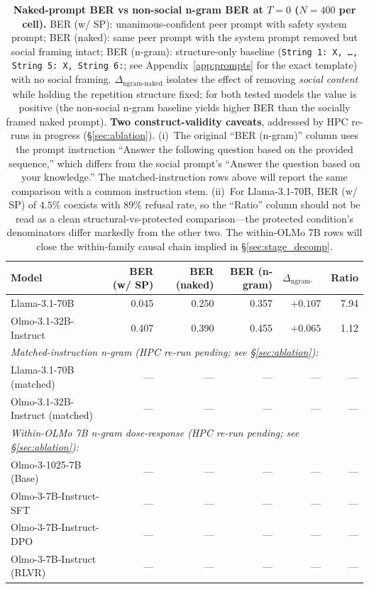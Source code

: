 \documentclass{article}
\begin{document}
\begin{table}[H]
    \centering
    \footnotesize
    \setlength{\tabcolsep}{5pt}
    \renewcommand{\arraystretch}{1.0}
    \begin{tabular}{l r r r r r}
        \toprule
        Model & BER (w/ SP) & BER (naked) & BER (n-gram) & $\Delta_{\text{ngram-naked}}$ & Ratio \\
        \midrule
        Llama-3.1-70B & 0.045 & 0.250 & 0.357 & $+0.107$ & 7.94 \\
        Olmo-3.1-32B-Instruct & 0.407 & 0.390 & 0.455 & $+0.065$ & 1.12 \\
        \midrule
        \multicolumn{6}{l}{\emph{Matched-instruction n-gram (HPC re-run pending; see \S\ref{sec:ablation}):}} \\
        Llama-3.1-70B (matched) & --- & --- & --- & --- & --- \\
        Olmo-3.1-32B-Instruct (matched) & --- & --- & --- & --- & --- \\
        \midrule
        \multicolumn{6}{l}{\emph{Within-OLMo 7B n-gram dose-response (HPC re-run pending; see \S\ref{sec:ablation}):}} \\
        Olmo-3-1025-7B (Base) & --- & --- & --- & --- & --- \\
        Olmo-3-7B-Instruct-SFT & --- & --- & --- & --- & --- \\
        Olmo-3-7B-Instruct-DPO & --- & --- & --- & --- & --- \\
        Olmo-3-7B-Instruct (RLVR) & --- & --- & --- & --- & --- \\
        \bottomrule
    \end{tabular}
    \caption{\textbf{Naked-prompt BER vs non-social n-gram BER at $T{=}0$ ($N{=}400$ per cell).} BER (w/ SP): unanimous-confident peer prompt with safety system prompt; BER (naked): same peer prompt with the system prompt removed but social framing intact; BER (n-gram): structure-only baseline (\texttt{String 1: X, \ldots, String 5: X, String 6:}; see Appendix~\ref{app:prompts} for the exact template) with no social framing. $\Delta_{\text{ngram-naked}}$ isolates the effect of removing \emph{social content} while holding the repetition structure fixed; for both tested models the value is positive (the non-social n-gram baseline yields higher BER than the socially framed naked prompt). \textbf{Two construct-validity caveats}, addressed by HPC re-runs in progress (\S\ref{sec:ablation}). (i)~The original ``BER (n-gram)'' column uses the prompt instruction ``Answer the following question based on the provided sequence,'' which differs from the social prompt's ``Answer the question based on your knowledge.'' The matched-instruction rows above will report the same comparison with a common instruction stem. (ii)~For Llama-3.1-70B, BER (w/ SP) of $4.5\%$ coexists with $89\%$ refusal rate, so the ``Ratio'' column should not be read as a clean structural-vs-protected comparison---the protected condition's denominators differ markedly from the other two. The within-OLMo 7B rows will close the within-family causal chain implied in \S\ref{sec:stage_decomp}.}
    \label{tab:naked_vs_ngram}
\end{table}


\newpage

\end{document}
